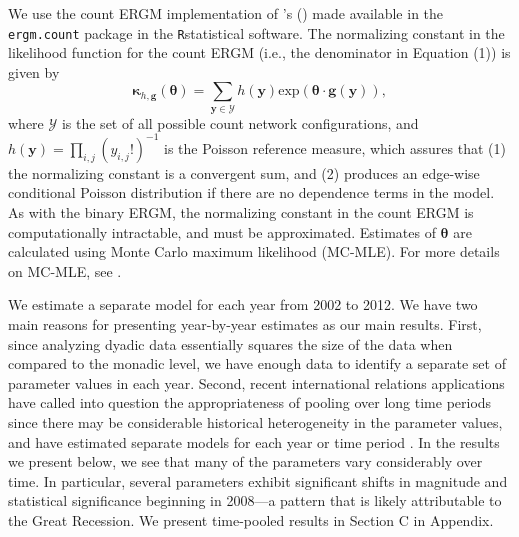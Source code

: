 \documentclass[reqno,onecolumn,letterpaper,12pt]{article}
\newcommand\citeapos[1]{\citeauthor{#1}'s (\citeyear{#1})}
\newcommand{\R}{\texttt{R}} %
\begin{document}
We use the count ERGM implementation of \citeapos{krivitsky2012exponential} made available in the \texttt{ergm.count} \citep{ergmcount} package in the \R \space statistical software. The normalizing constant in the likelihood function for the count ERGM (i.e., the denominator in Equation (1)) is given by $$ \bm{\kappa}_{h,\bm{g}}(\bm{\theta}) =  \sum_{\bm{y} \in \bm{\mathcal{Y} } }  h(\bm{y})\text{exp}( \bm {\theta} \cdot \bm{g} (\bm{y}) ), $$ where $\bm{\mathcal{Y} }$ is the set of all possible count network configurations, and $h(\bm{y}) = \prod_{i,j} (y_{i,j}!)^{-1}$ is the Poisson reference measure, which assures that (1) the normalizing constant is a convergent sum, and (2) produces an edge-wise conditional Poisson distribution if there are no dependence terms in the model. As with the binary ERGM, the normalizing constant in the count ERGM is computationally intractable, and must be approximated. Estimates of $\bm {\theta} $ are calculated using Monte Carlo maximum likelihood (MC-MLE). For more details on MC-MLE, see  \citet{snijders2002markov}. %


We estimate a separate model for each year from 2002 to 2012. We have two main reasons for presenting year-by-year estimates as our main results. First, since analyzing dyadic data essentially squares the size of the data when compared to the monadic level, we have enough data to identify a separate set of parameter values in each year. Second, recent international relations applications have called into question the appropriateness of pooling over long time periods since there may be considerable historical heterogeneity in the parameter values, and have estimated separate models for each year or time period  \citep[see,~e.g.,][]{cranmer2014reciprocity,ward2007persistent}. In the results we present below, we see that many of the parameters vary considerably over time. In particular, several parameters exhibit significant shifts in magnitude and statistical significance beginning in 2008---a pattern that is likely attributable to the Great Recession. %
We present time-pooled results in Section C in Appendix.
\end{document}
